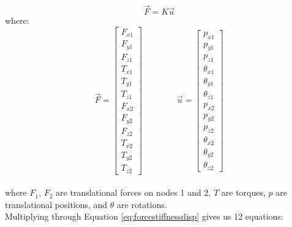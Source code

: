 { \begin{equation} \label{eq:forcestiffnessdisp} \vec{F} = K\vec{u} \end{equation}
where:
\[ \vec{F} =  \left[ \begin{array}{ccc}
F_{x1}\\
F_{y1}\\
F_{z1}\\
T_{x1}\\
T_{y1}\\
T_{z1}\\
F_{x2}\\
F_{y2}\\
F_{z2}\\
T_{x2}\\
T_{y2}\\
T_{z2}
 \end{array} \right]  \qquad \qquad  
 \vec{u} =  \left[ \begin{array}{ccc}
p_{x1}\\
p_{y1}\\
p_{z1}\\
\theta_{x1}\\
\theta_{y1}\\
\theta_{z1}\\
p_{x2}\\
p_{y2}\\
p_{z2}\\
\theta_{x2}\\
\theta_{y2}\\
\theta_{z2}
 \end{array} \right]
 \]\\
 
where $F_1$, $F_2$ are translational forces on nodes 1 and 2, $T$ are torques, $p$ are translational positions, and $\theta$ are rotations.\\

Multiplying through Equation \ref{eq:forcestiffnessdisp} gives us 12 equations:

}

